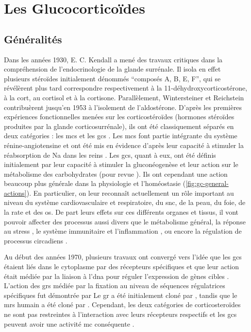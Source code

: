 \documentclass[../main.tex]{subfiles}
\begin{document}
\chapter{Les Glucocorticoïdes}


\section{Généralités}
Dans les années 1930, E. C. Kendall a mené des travaux critiques dans la compréhension de l'endocrinologie de la glande surrénale.
Il isola en effet plusieurs stéroïdes initialement dénommés ``composés A, B, E, F'', qui se révélèrent plus tard correspondre respectivement à la 11-déhydroxycorticostérone, à la \gls{cort}, au cortisol et à la cortisone.
Parallèlement, Wintersteiner et Reichstein contribuèrent jusqu'en 1953 à l'isolement de l'aldostérone.
D'après les premières expériences fonctionnelles menées sur les corticostéroïdes (hormones stéroïdes produites par la glande corticosurrénale), ils ont été classiquement séparés en deux catégories : les \glspl{mc} et les \glspl{gc} \citep{Simpson1952,Simpson1954}.
Les \glspl{mc} font partie intégrante du système rénine-angiotensine et ont été mis en évidence d'après leur capacité à stimuler la réabsorption de \gls{Na} dans les reins \citep{Gomez-Sanchez1996}.
Les \glspl{gc}, quant à eux, ont été définis initialement par leur capacité à stimuler la gluconéogenèse et leur action sur le métabolisme des carbohydrates (pour revue \citealp{McMahon1988}).
Ils ont cependant une action beaucoup plus générale dans la physiologie et l'homéostasie (\autoref{fig:gc-general-actions}).
En particulier, on leur reconnaît actuellement un rôle important au niveau du système cardiovasculaire et respiratoire, du \gls{snc}, de la peau, du foie, de la rate et des os.
De part leurs effets sur ces différents organes et tissus, il vont pouvoir affecter des processus aussi divers que le métabolisme général, la réponse au stress \citep{Sapolsky2000}, le système immunitaire et l'inflammation \citep{Busillo2013}, ou encore la régulation de processus circadiens \citep{Dickmeis2009}.



Au début des années 1970, plusieurs travaux ont convergé vers l'idée que les \glspl{gc} étaient liés dans le cytoplasme par des récepteurs spécifiques \citep{Baxter1971,Rousseau1972} et que leur action était médiée par la liaison à l'\gls{dna} pour réguler l'expression de gènes cibles \citep{Baxter1972,Payvar1981}.
L'action des \glspl{gr} médiée par la fixation au niveau de séquences régulatrices spécifiques fut démontrée par \citet{Chandler1983,Karin1984,Slater1985}
Le \gls{gr} a été initialement cloné par \citet{Weinberger1985}, tandis que le \glspl{mr} humain a été cloné par \citet{Arriza1987}.
Cependant, les deux catégories de corticosteroïdes ne sont pas restreintes à l'interaction avec leurs récepteurs respectifs et les \glspl{gc} peuvent avoir une activité \gls{mc} conséquente \citep{Funder1973,Reul1990}.
\end{document}
